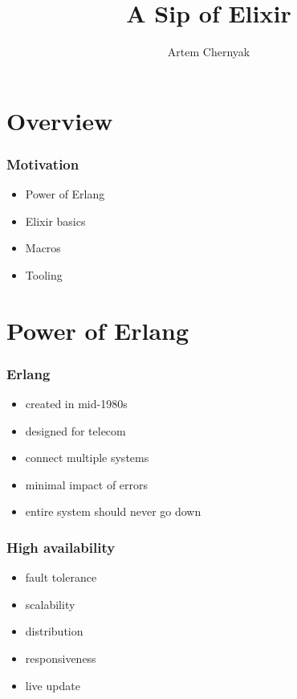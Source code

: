 \documentclass{beamer}
\begin{document}
\title{A Sip of Elixir}
\author{Artem Chernyak}

\frame{\titlepage}


\section[Section]{Overview}

\begin{frame}
  \frametitle{Motivation}
  \begin{itemize}
  \item Power of Erlang
  \item Elixir basics
  \item Macros
  \item Tooling
  \end{itemize}
\end{frame}

\section[Section]{Power of Erlang}

\begin{frame}
  \frametitle{Erlang}
  \begin{itemize}
  \item created in mid-1980s
  \item designed for telecom
  \item connect multiple systems
  \item minimal impact of errors
  \item entire system should never go down
  \end{itemize}
\end{frame}

\begin{frame}
  \frametitle{High availability}
  \begin{itemize}
  \item fault tolerance
  \item scalability
  \item distribution
  \item responsiveness
  \item live update
  \end{itemize}
\end{frame}
\end{document}

